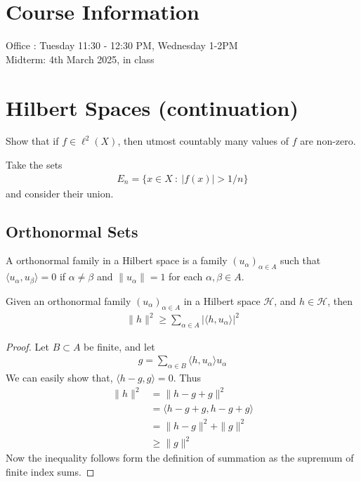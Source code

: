 
\chapter*{Course Information}

Office : Tuesday 11:30 - 12:30 PM, Wednesday 1-2PM\\
Midterm: 4th March 2025, in class

\chapter{Hilbert Spaces (continuation)}

\begin{exercise}[Warm up]
  \label{warm_up1}
  Show that if $f \in \ell^{2}(X)$, then utmost countably many values
  of $f$ are non-zero.
\end{exercise}
\begin{solution}
  Take the sets
  \begin{align*}
    E_n = \{ x \in X  \ : \  |f(x)|>1/n \}
  \end{align*}
  and consider their union.
\end{solution}

\section{Orthonormal Sets}

\begin{definition}
  A orthonormal family in a Hilbert space is a family
  $(u_\alpha)_{\alpha \in A}$ such that $\langle  u_\alpha ,  u_\beta
  \rangle  = 0$ if $\alpha \neq \beta$ and $\|u_\alpha\| = 1$ for
  each $ \alpha, \beta \in A$.
\end{definition}

\begin{theorem}
  Given an orthonormal family $(u_\alpha)_{\alpha \in A}$ in a
  Hilbert space $\mathcal{H}$, and $h \in \mathcal{H}$, then
  \begin{align*}
    \|h\|^2 \ge \sum_{\alpha \in  A} |\langle h , u_\alpha \rangle |^2
  \end{align*}
\end{theorem}
\begin{proof}
  Let $B \subset A$ be finite, and let
  \begin{align*}
    g = \sum_{\alpha \in  B} \langle h , u_\alpha \rangle  u_\alpha
  \end{align*}
  We can easily show that, $\langle h-g , g \rangle  = 0$. Thus
  \begin{align*}
    \|h\|^2 &= \|h - g + g\|^2 \\
    &= \langle h-g +g , h-g +g \rangle \\
    &= \|h - g\|^2 + \|g\|^2 \\
    & \ge \|g\|^2
  \end{align*}
  Now the inequality follows form the definition of summation as the
  supremum of finite index sums.
\end{proof}

